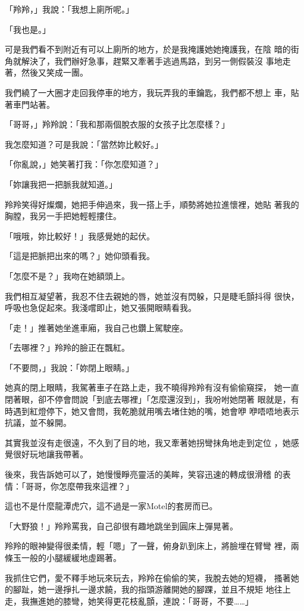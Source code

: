 「羚羚，」我說：「我想上廁所呢。」

「我也是。」

可是我們看不到附近有可以上廁所的地方，於是我掩護她她掩護我，在陰
暗的街角就解決了，我們辦好急事，趕緊又牽著手逃過馬路，到另一側假裝沒
事地走著，然後又笑成一團。

我們繞了一大圈才走回我停車的地方，我玩弄我的車鑰匙，我們都不想上
車，貼著車門站著。

「哥哥，」羚羚說：「我和那兩個脫衣服的女孩子比怎麼樣？」

我怎麼知道？可是我說：「當然妳比較好。」

「你亂說，」她笑著打我：「你怎麼知道？」

「妳讓我把一把脈我就知道。」

羚羚笑得好燦爛，她把手伸過來，我一搭上手，順勢將她拉進懷裡，她貼
著我的胸膛，我另一手把她輕輕摟住。

「哦哦，妳比較好！」我感覺她的起伏。

「這是把脈把出來的嗎？」她仰頭看我。

「怎麼不是？」我吻在她額頭上。

我們相互凝望著，我忍不住去親她的唇，她並沒有閃躲，只是睫毛顫抖得
很快，呼吸也急促起來。我淺嚐即止，她又張開眼睛看我。

「走！」推著她坐進車廂，我自己也鑽上駕駛座。

「去哪裡？」羚羚的臉正在飄紅。

「不要問，」我說：「妳閉上眼睛。」

她真的閉上眼睛，我駕著車子在路上走，我不曉得羚羚有沒有偷偷窺探，
她一直閉著眼，卻不停會問說「到底去哪裡」「怎麼還沒到」，我吩咐她閉著
眼就是，有時遇到紅燈停下，她又會問，我乾脆就用嘴去堵住她的嘴，她會咿
咿唔唔地表示抗議，並不躲開。

其實我並沒有走很遠，不久到了目的地，我又牽著她拐彎抹角地走到定位
，她感覺很好玩地讓我帶著。

後來，我告訴她可以了，她慢慢睜亮靈活的美眸，笑容迅速的轉成很滑稽
的表情：「哥哥，你怎麼帶我來這裡？」

這也不是什麼龍潭虎穴，這不過是一家Motel的套房而已。

「大野狼！」羚羚罵我，自己卻很有趣地跳坐到圓床上彈晃著。

羚羚的眼神變得很柔情，輕「嗯」了一聲，俯身趴到床上，將臉埋在臂彎
裡，兩條玉一般的小腿緩緩地虛踢著。

我抓住它們，愛不釋手地玩來玩去，羚羚在偷偷的笑，我脫去她的短襪，
搔著她的腳趾，她一邊掙扎一邊求饒，我的指頭游離開她的腳踝，並且不規矩
地往上走，我撫進她的膝彎，她笑得更花枝亂顫，連說：「哥哥，不要……」

